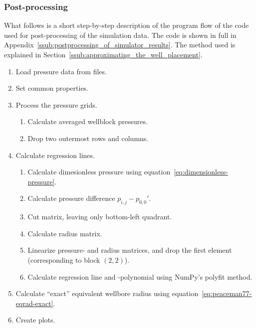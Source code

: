 \subsubsection{Post-processing} %
\label{ssub:post_processing}
What follows is a short step-by-step description of the program flow of the code used for post-processing of the simulation data. The code is shown in full in Appendix~\ref{ssub:postprocessing_of_simulator_results}. The method used is explained in Section~\ref{ssub:approximating_the_well_placement}.
\begin{enumerate}
    \item Load pressure data from files.
    \item Set common properties.
    \item Process the pressure grids.
    \begin{enumerate}
        \item Calculate averaged wellblock pressures.
        \item Drop two outermost rows and columns.
    \end{enumerate}
    \item Calculate regression lines.
    \begin{enumerate}
        \item Calculate dimesionless pressure using equation~\eqref{eq:dimensionless-pressure}.
        \item Calculate pressure difference $p_{i,j}-p_{0,0}'$.
        \item Cut matrix, leaving only bottom-left quadrant.
        \item Calculate radius matrix.
        \item Linearize pressure- and radius matrices, and drop the first element (corresponding to block $(2,2)$).
        \item Calculate regression line and -polynomial using NumPy's polyfit method.
    \end{enumerate}
    \item Calculate ``exact'' equivalent wellbore radius using equation~\eqref{eq:peaceman77-eqrad-exact}.
    \item Create plots.
\end{enumerate}


